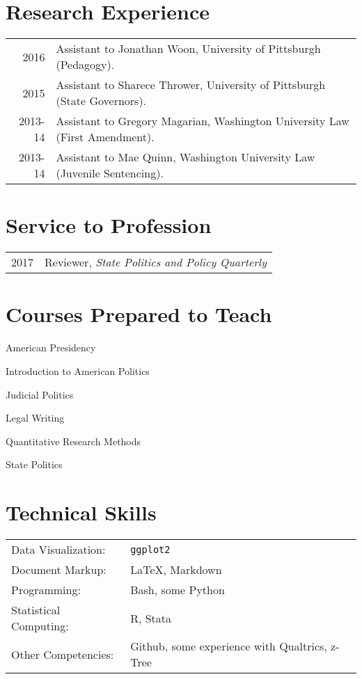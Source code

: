\documentclass[12pt,letterpaper]{article}
\begin{document}
\section*{\sf Research Experience}
\begin{tabularx}{\textwidth}{@{}DX@{}}
  2016 & Assistant to Jonathan Woon, University of Pittsburgh (Pedagogy). \\
  2015 & Assistant to Sharece Thrower, University of Pittsburgh (State Governors). \\
  2013-14 & Assistant to Gregory Magarian, Washington University Law (First Amendment). \\
  2013-14 & Assistant to Mae Quinn, Washington University Law (Juvenile Sentencing).
\end{tabularx} \par\bigskip


\section*{\sf Service to Profession}
\begin{tabularx}{\textwidth}{@{}DX@{}}
  2017 & Reviewer, {\em State Politics and Policy Quarterly} \bigskip \\
\end{tabularx} \par\bigskip


\section*{\sf Courses Prepared to Teach}
American Presidency \par
Introduction to American Politics \par
Judicial Politics \par
Legal Writing \par
Quantitative Research Methods \par
State Politics \par

\section*{\sf Technical Skills}
\begin{tabularx}{\textwidth}{@{}lX@{}}
Data Visualization: & {\tt ggplot2} \\
Document Markup: & \LaTeX, Markdown \\
Programming: & Bash, some Python \\
Statistical Computing: & R, Stata \\
Other Competencies: & Github, some experience with Qualtrics, z-Tree

\end{tabularx}
\end{document}

